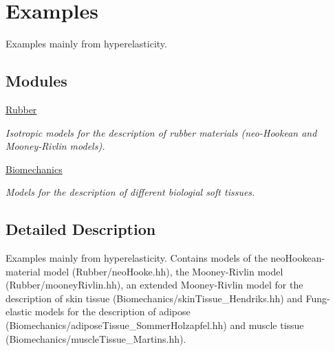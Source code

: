 \hypertarget{group__Examples}{\section{\-Examples}
\label{group__Examples}
}


\-Examples mainly from hyperelasticity.  


\subsection*{\-Modules}
\begin{DoxyCompactItemize}
\item 
\hyperlink{group__Rubber}{\-Rubber}
\begin{DoxyCompactList}\small\item\em \-Isotropic models for the description of rubber materials (neo-\/\-Hookean and \-Mooney-\/\-Rivlin models). \end{DoxyCompactList}\item 
\hyperlink{group__Biomechanics}{\-Biomechanics}
\begin{DoxyCompactList}\small\item\em \-Models for the description of different biologial soft tissues. \end{DoxyCompactList}\end{DoxyCompactItemize}


\subsection{\-Detailed \-Description}
\-Examples mainly from hyperelasticity. \-Contains models of the neo\-Hookean-\/material model (\-Rubber/neo\-Hooke.\-hh), the \-Mooney-\/\-Rivlin model (\-Rubber/mooney\-Rivlin.\-hh), an extended \-Mooney-\/\-Rivlin model for the description of skin tissue (\-Biomechanics/skin\-Tissue\-\_\-\-Hendriks.\-hh) and \-Fung-\/elastic models for the description of adipose (\-Biomechanics/adipose\-Tissue\-\_\-\-Sommer\-Holzapfel.\-hh) and muscle tissue (\-Biomechanics/muscle\-Tissue\-\_\-\-Martins.\-hh). 
